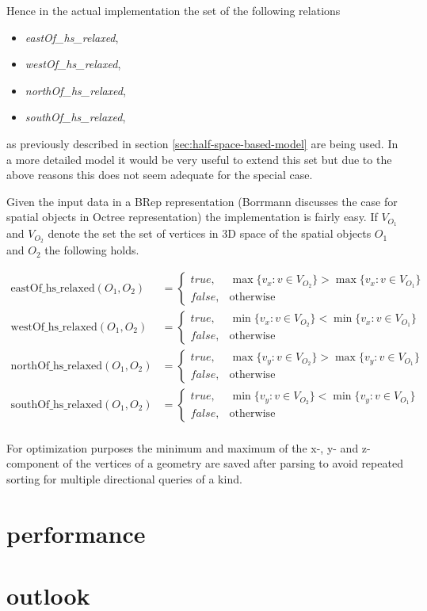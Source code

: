\documentclass[paper=a4, fontsize=11pt]{scrartcl} %
\numberwithin{equation}{section} %
\numberwithin{figure}{section} %
\numberwithin{table}{section} %
\begin{document}
Hence in the actual implementation the set of the following relations
\begin{itemize}
\item \textit{eastOf\_hs\_relaxed},
\item \textit{westOf\_hs\_relaxed},
\item \textit{northOf\_hs\_relaxed},
\item \textit{southOf\_hs\_relaxed},
\end{itemize}
as previously described in section \ref{sec:half-space-based-model} are being used. In a more detailed model it would be very useful to extend this set but due to the above reasons this does not seem adequate for the special case. 

Given the input data in a BRep representation (Borrmann \cite{Borrmann:2009:AEI} discusses the case for spatial objects in Octree representation) the implementation is fairly easy. If $V_{O_1}$ and $V_{O_2}$ denote the set  the set of vertices in 3D space of the spatial objects $O_1$ and $O_2$ the following holds.

\begin{align*}
  \mathrm{eastOf\_hs\_relaxed}(O_1,O_2) &= \begin{cases} true, & \max\{v_x:v\in V_{O_{2}}\} > \max\{v_x:v\in V_{O_1}\} \\ false, & \mathrm{otherwise} \end{cases} \\
  \mathrm{westOf\_hs\_relaxed}(O_1,O_2) &= \begin{cases} true, & \min\{v_x:v\in V_{O_{2}}\} < \min\{v_x:v\in V_{O_1}\} \\ false, & \mathrm{otherwise} \end{cases} \\
  \mathrm{northOf\_hs\_relaxed}(O_1,O_2) &= \begin{cases} true, & \max\{v_y:v\in V_{O_{2}}\} > \max\{v_y:v\in V_{O_1}\} \\ false, & \mathrm{otherwise} \end{cases} \\
  \mathrm{southOf\_hs\_relaxed}(O_1,O_2) &= \begin{cases} true, & \min\{v_y:v\in V_{O_{2}}\} < \min\{v_y:v\in V_{O_1}\} \\ false, & \mathrm{otherwise} \end{cases} \\
\end{align*}

For optimization purposes the minimum and maximum of the x-, y- and z-component of the vertices of a geometry are saved after parsing to avoid repeated sorting for multiple directional queries of a kind. 

\section{performance}\label{sec:performance}
\section{outlook}\label{sec:outlook}


\newpage
{}

\end{document}
